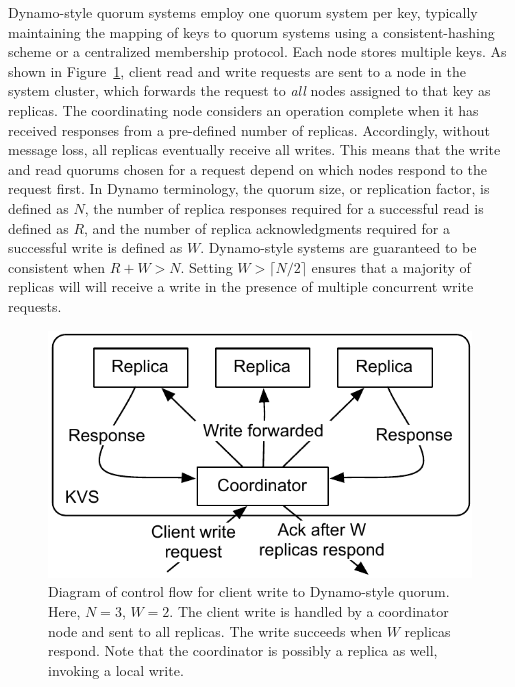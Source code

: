 \documentclass{vldb}
\begin{document}
Dynamo-style quorum systems employ one quorum system per key,
typically maintaining the mapping of keys to quorum systems using a
consistent-hashing scheme or a centralized membership protocol. Each
node stores multiple keys.  As shown in
Figure~\ref{fig:dynamo-quorum}, client read and write requests are
sent to a node in the system cluster, which forwards the request to
\textit{all} nodes assigned to that key as replicas.  The coordinating
node considers an operation complete when it has received responses
from a pre-defined number of replicas.  Accordingly, without message
loss, all replicas eventually receive all writes.  This means that the
write and read quorums chosen for a request depend on which nodes
respond to the request first.  In Dynamo terminology, the quorum size,
or replication factor, is defined as $N$, the number of replica
responses required for a successful read is defined as $R$, and the
number of replica acknowledgments required for a successful write is
defined as $W$. Dynamo-style systems are guaranteed to be consistent
when $R+W > N$.  Setting $W>\lceil N/2 \rceil$ ensures that a majority
of replicas will will receive a write in the presence of multiple
concurrent write requests.

\begin{figure}
\centering
\includegraphics[width=.85\columnwidth]{figs/dynamo-quorum.pdf}
\vspace{-8pt}
\caption{Diagram of control flow for client write to Dynamo-style
  quorum.  Here, $N=3$, $W=2$. The client write is handled by a
  coordinator node and sent to all replicas. The write succeeds when
  $W$ replicas respond.  Note that the coordinator is possibly a
  replica as well, invoking a local write.}
\vspace{-12pt}
\label{fig:dynamo-quorum}
\end{figure}
\end{document}
